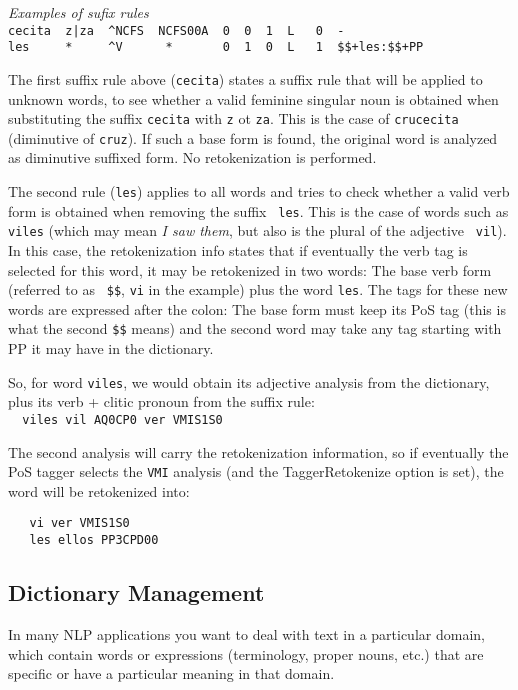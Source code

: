 \documentclass[a4paper]{book}
\begin{document}
 \noindent \textit{Examples of sufix rules}\\
  \verb#cecita  z|za  ^NCFS  NCFS00A  0  0  1  L   0  -#\\
  \verb#les     *     ^V      *       0  1  0  L   1  $$+les:$$+PP#

  The first suffix rule above ({\tt cecita}) states a suffix rule that
  will be applied to unknown words, to see whether a valid feminine
  singular noun is obtained when substituting the suffix {\tt cecita}
  with {\tt z} ot {\tt za}. This is the case of {\tt crucecita}
  (diminutive of {\tt cruz}). If such a base form is found, the
  original word is analyzed as diminutive suffixed form. No
  retokenization is performed.

  The second rule ({\tt les}) applies to all words and tries to check
  whether a valid verb form is obtained when removing the suffix {\tt
    les}. This is the case of words such as {\tt viles} (which may
  mean {\sl I saw them}, but also is the plural of the adjective {\tt
    vil}). In this case, the retokenization info states that if
  eventually the verb tag is selected for this word, it may be
  retokenized in two words: The base verb form (referred to as {\tt
    \$\$}, {\tt vi} in the example) plus the word {\tt les}. The tags
  for these new words are expressed after the colon: The base form
  must keep its PoS tag (this is what the second {\tt \$\$} means) and
  the second word may take any tag starting with PP it may have in the
  dictionary.

  So, for word {\tt viles}, we would obtain its adjective analysis
  from the dictionary, plus its verb + clitic pronoun from the suffix
  rule:\\ 
  \verb#  viles vil AQ0CP0 ver VMIS1S0#

  The second analysis will carry the retokenization information, so if
  eventually the PoS tagger selects the {\tt VMI} analysis (and the
  TaggerRetokenize option is set), the word will be retokenized into:
\begin{verbatim}
   vi ver VMIS1S0
   les ellos PP3CPD00
\end{verbatim}

\subsection{Dictionary Management}

 In many NLP applications you want to deal with text in a particular domain, 
which contain words or expressions (terminology, proper nouns, etc.) 
that are specific or have a particular meaning in that domain.
 
\end{document}
